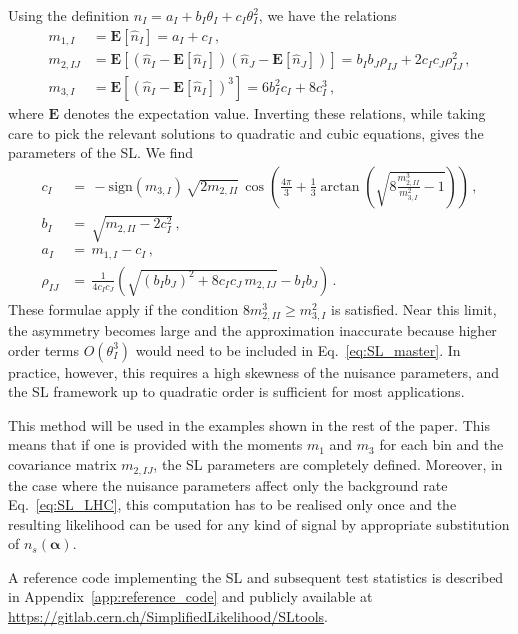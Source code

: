 \documentclass[11pt]{article}
\begin{document}
Using the definition $ n_I= a_I+b_I \theta_I+c_I \theta_I^2 $, we have the relations
%
\begin{align} \label{eq:moments1}
  m_{1,I} &= \mathbf{E}[\hat n_I]= a_I+c_I\,,\\
  m_{2,IJ} &= \mathbf{E}[(\hat n_I - \mathbf{E}[\hat n_I])(\hat n_J - \mathbf{E}[\hat n_J]) ]= b_I b_J \rho_{IJ}+2 c_I c_J\rho_{IJ}^2\,,\\
  m_{3,I} &= \mathbf{E}[(\hat n_I - \mathbf{E}[\hat n_I])^3 ]=   6 b_I^2 c_I+8 c_I^3 \, ,
  \label{eq:moments2}
\end{align}
%
where $\mathbf{E}$ denotes the expectation value.
Inverting these relations, while taking care to pick the relevant solutions to quadratic and cubic equations, gives the parameters of the SL.  We find
%
\begin{align}
c_I &= \, -\mathrm{sign}(m_{3,I}) \, \sqrt{2 m_{2,II}} \, \cos\!\left(\frac{4\pi}{3}+\frac{1}{3}\arctan\left(\sqrt{8 \frac{m^3_{2,II}}{m^2_{3,I}}-1}\right)  \right)\, , \label{eq:solutions1}
\\
b_I &= \, \sqrt{m_{2,II}-2 c_I^2 }\,,\\
a_I &= \, m_{1,I}- c_I\,,\\
\rho_{IJ} &= \, \frac{1}{4 c_I c_J}\left( \sqrt{(b_I b_J)^2+8 c_I c_J\,m_{2,IJ}}-b_I b_J \right) \, .
\label{eq:solutions2}
\end{align}
%
These formulae apply if the condition $8 m_{2,II}^3\geq m_{3,I}^2$ is satisfied.   
Near this limit,  the asymmetry becomes large and the approximation inaccurate  
because higher order terms $O(\theta_I^3)$  would need to be included in Eq.~\eqref{eq:SL_master}. 
In practice, however, this requires a high skewness of the nuisance parameters, and the SL framework up to quadratic order is sufficient for most applications.

This method will be used in the examples shown in the rest of the paper. 
 This means that if one is provided with the moments $m_{1}$ and $m_{3}$ for each bin and the covariance matrix $m_{2,IJ}$, the SL parameters are completely defined. Moreover, in the case where the nuisance parameters affect only the background rate Eq.~\eqref{eq:SL_LHC}, this computation has to be realised only once and the resulting likelihood can be used for any kind of signal by appropriate substitution of $n_{s}(\bm{\alpha})$.

A reference code implementing the SL and subsequent test statistics is described in Appendix~\ref{app:reference_code}
and publicly available at \url{https://gitlab.cern.ch/SimplifiedLikelihood/SLtools}.
\end{document}
